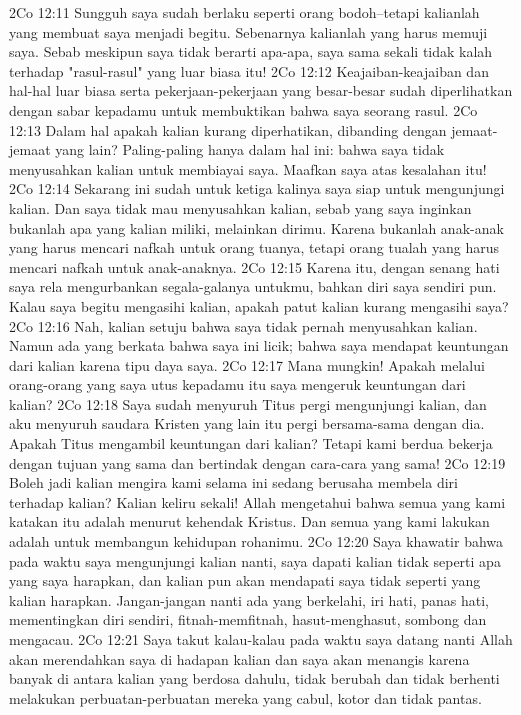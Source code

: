 2Co 12:11  Sungguh saya sudah berlaku seperti orang bodoh--tetapi kalianlah yang membuat saya menjadi begitu. Sebenarnya kalianlah yang harus memuji saya. Sebab meskipun saya tidak berarti apa-apa, saya sama sekali tidak kalah terhadap "rasul-rasul" yang luar biasa itu!
2Co 12:12  Keajaiban-keajaiban dan hal-hal luar biasa serta pekerjaan-pekerjaan yang besar-besar sudah diperlihatkan dengan sabar kepadamu untuk membuktikan bahwa saya seorang rasul.
2Co 12:13  Dalam hal apakah kalian kurang diperhatikan, dibanding dengan jemaat-jemaat yang lain? Paling-paling hanya dalam hal ini: bahwa saya tidak menyusahkan kalian untuk membiayai saya. Maafkan saya atas kesalahan itu!
2Co 12:14  Sekarang ini sudah untuk ketiga kalinya saya siap untuk mengunjungi kalian. Dan saya tidak mau menyusahkan kalian, sebab yang saya inginkan bukanlah apa yang kalian miliki, melainkan dirimu. Karena bukanlah anak-anak yang harus mencari nafkah untuk orang tuanya, tetapi orang tualah yang harus mencari nafkah untuk anak-anaknya.
2Co 12:15  Karena itu, dengan senang hati saya rela mengurbankan segala-galanya untukmu, bahkan diri saya sendiri pun. Kalau saya begitu mengasihi kalian, apakah patut kalian kurang mengasihi saya?
2Co 12:16  Nah, kalian setuju bahwa saya tidak pernah menyusahkan kalian. Namun ada yang berkata bahwa saya ini licik; bahwa saya mendapat keuntungan dari kalian karena tipu daya saya.
2Co 12:17  Mana mungkin! Apakah melalui orang-orang yang saya utus kepadamu itu saya mengeruk keuntungan dari kalian?
2Co 12:18  Saya sudah menyuruh Titus pergi mengunjungi kalian, dan aku menyuruh saudara Kristen yang lain itu pergi bersama-sama dengan dia. Apakah Titus mengambil keuntungan dari kalian? Tetapi kami berdua bekerja dengan tujuan yang sama dan bertindak dengan cara-cara yang sama!
2Co 12:19  Boleh jadi kalian mengira kami selama ini sedang berusaha membela diri terhadap kalian? Kalian keliru sekali! Allah mengetahui bahwa semua yang kami katakan itu adalah menurut kehendak Kristus. Dan semua yang kami lakukan adalah untuk membangun kehidupan rohanimu.
2Co 12:20  Saya khawatir bahwa pada waktu saya mengunjungi kalian nanti, saya dapati kalian tidak seperti apa yang saya harapkan, dan kalian pun akan mendapati saya tidak seperti yang kalian harapkan. Jangan-jangan nanti ada yang berkelahi, iri hati, panas hati, mementingkan diri sendiri, fitnah-memfitnah, hasut-menghasut, sombong dan mengacau.
2Co 12:21  Saya takut kalau-kalau pada waktu saya datang nanti Allah akan merendahkan saya di hadapan kalian dan saya akan menangis karena banyak di antara kalian yang berdosa dahulu, tidak berubah dan tidak berhenti melakukan perbuatan-perbuatan mereka yang cabul, kotor dan tidak pantas.
